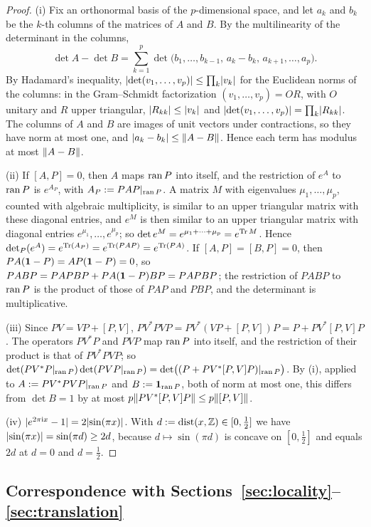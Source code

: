 \begin{proof}
(i) Fix an orthonormal basis of the $p$-dimensional space, and let $a_k$ and $b_k$ be the $k$-th columns of the
matrices of $A$ and $B$. By the multilinearity of the determinant in the columns,
\[
\det A-\det B=\sum_{k=1}^p\det\bigl(b_1,\dots,b_{k-1},\,a_k-b_k,\,a_{k+1},\dots,a_p\bigr).
\]
By Hadamard's inequality, $\lvert\det(v_1,\dots,v_p)\rvert\le\prod_k\lvert v_k\rvert$ for the Euclidean norms of the columns: in the
Gram--Schmidt factorization $(v_1,\dots,v_p)=OR$, with $O$ unitary and $R$ upper triangular, $\lvert R_{kk}\rvert\le\lvert v_k\rvert$ and
$\lvert\det(v_1,\dots,v_p)\rvert=\prod_k\lvert R_{kk}\rvert$. The columns of $A$ and $B$ are images of unit vectors under contractions,
so they have norm at most one, and $\lvert a_k-b_k\rvert\le\lVert A-B\rVert$. Hence each term has modulus at most $\lVert A-B\rVert$.

(ii) If $[A,P]=0$, then $A$ maps $\operatorname{ran} P$ into itself, and the restriction of $e^A$ to $\operatorname{ran} P$ is $e^{A_P}$, with
$A_P:=PAP|_{\operatorname{ran} P}$. A matrix $M$ with eigenvalues $\mu_1,\dots,\mu_p$, counted with algebraic multiplicity, is similar
to an upper triangular matrix with these diagonal entries, and $e^M$ is then similar to an upper triangular matrix
with diagonal entries $e^{\mu_1},\dots,e^{\mu_p}$; so $\det e^M=e^{\mu_1+\dots+\mu_p}=e^{\operatorname{Tr} M}$. Hence
$\det\nolimits_{P}(e^A)=e^{\operatorname{Tr}(A_P)}=e^{\operatorname{Tr}(PAP)}=e^{\operatorname{Tr}(PA)}$. If $[A,P]=[B,P]=0$, then $PA(\mathbf{1}-P)=AP(\mathbf{1}-P)=0$, so
$PABP=PAPBP+PA(\mathbf{1}-P)BP=PAPBP$; the restriction of $PABP$ to $\operatorname{ran} P$ is the product of those of $PAP$ and $PBP$, and
the determinant is multiplicative.

(iii) Since $PV=VP+[P,V]$, $PV^*PVP=PV^*(VP+[P,V])P=P+PV^*[P,V]P$. The operators $PV^*P$ and $PVP$ map $\operatorname{ran} P$ into itself,
and the restriction of their product is that of $PV^*PVP$; so
$\det(PV^*P|_{\operatorname{ran} P})\det(PVP|_{\operatorname{ran} P})=\det\bigl((P+PV^*[P,V]P)|_{\operatorname{ran} P}\bigr)$. By (i), applied to
$A:=PV^*PVP|_{\operatorname{ran} P}$ and $B:=\mathbf{1}_{\operatorname{ran} P}$, both of norm at most one, this differs from $\det B=1$ by at most
$p\lVert PV^*[P,V]P\rVert\le p\lVert[P,V]\rVert$.

(iv) $\lvert e^{2\pi\mathrm{i} x}-1\rvert=2\lvert\sin(\pi x)\rvert$. With $d:=\operatorname{dist}(x,\mathbb{Z})\in[0,\frac12]$ we have $\lvert\sin(\pi x)\rvert=\sin(\pi d)\ge2d$,
because $d\mapsto\sin(\pi d)$ is concave on $[0,\frac12]$ and equals $2d$ at $d=0$ and $d=\frac12$.
\end{proof}

\subsection{Correspondence with Sections~\ref{sec:locality}--\ref{sec:translation}}

